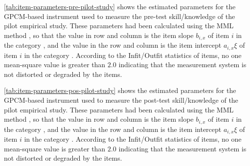 \autoref{tab:item-parameters-pre-pilot-study} shows the estimated parameters for the GPCM-based instrument used to measure the pre-test skill/knowledge of the pilot empirical study.
These parameters had been calculated using the MML method \cite{BockAitkin1981}, so that the value in row  and column  is the item slope $b_{i,x}$ of item $i$ in the category , and the value in the row  and column  is the item intercept $a_{i,x}\xi$ of item $i$ in the category .
According to the Infit/Outfit statistics of items, no one mean-square value is greater than $2.0$ indicating that the measurement system is not distorted or degraded by the items.


\autoref{tab:item-parameters-pos-pilot-study} shows the estimated parameters for the GPCM-based instrument used to measure the post-test skill/knowledge of the pilot empirical study.
These parameters had been calculated using the MML method \cite{BockAitkin1981}, so that the value in row  and column  is the item slope $b_{i,x}$ of item $i$ in the category , and the value in the row  and column  is the item intercept $a_{i,x}\xi$ of item $i$ in the category .
According to the Infit/Outfit statistics of items, no one mean-square value is greater than $2.0$ indicating that the measurement system is not distorted or degraded by the items.

